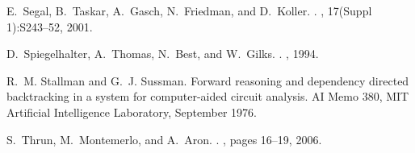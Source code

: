 \documentclass[10pt]{sigplanconf}
\begin{document}
\begin{thebibliography}{10}
E.~Segal, B.~Taskar, A.~Gasch, N.~Friedman, and D.~Koller.
.
, 17(Suppl 1):S243--52, 2001.

D.~Spiegelhalter, A.~Thomas, N.~Best, and W.~Gilks.
.
, 1994.

R.~M. Stallman and G.~J. Sussman.
\newblock Forward reasoning and dependency directed backtracking in a system
  for computer-aided circuit analysis.
\newblock AI Memo 380, MIT Artificial Intelligence Laboratory, September 1976.

S.~Thrun, M.~Montemerlo, and A.~Aron.
.
, pages 16--19, 2006.

\end{thebibliography}

%
%
\end{document}
